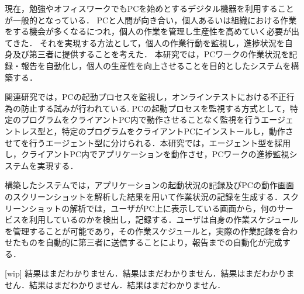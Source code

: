 現在，勉強やオフィスワークでもPCを始めとするデジタル機器を利用することが一般的となっている．
PCと人間が向き合い，個人あるいは組織における作業をする機会が多くなるにつれ，個人の作業を管理し生産性を高めていく必要が出てきた．
それを実現する方法として，個人の作業行動を監視し，進捗状況を自身及び第三者に提供することを考えた．
本研究では，PCワークの作業状況を記録・報告を自動化し，個人の生産性を向上させることを目的としたシステムを構築する．

関連研究では，PCの起動プロセスを監視し，オンラインテストにおける不正行為の防止する試みが行われている.
PCの起動プロセスを監視する方式として，特定のプログラムをクライアントPC内で動作させることなく監視を行うエージェントレス型と，特定のプログラムをクライアントPCにインストールし，動作させてを行うエージェント型に分けられる．本研究では，エージェント型を採用し，クライアントPC内でアプリケーションを動作させ，PCワークの進捗監視システムを実現する．

構築したシステムでは，アプリケーションの起動状況の記録及びPCの動作画面のスクリーンショットを解析した結果を用いて作業状況の記録を生成する．スクリーンショットの解析では，ユーザがPC上に表示している画面から，何のサービスを利用しているのかを検出し，記録する．ユーザは自身の作業スケジュールを管理することが可能であり，その作業スケジュールと，実際の作業記録を合わせたものを自動的に第三者に送信することにより，報告までの自動化が完成する．

[wip] 結果はまだわかりません．結果はまだわかりません．結果はまだわかりません．結果はまだわかりません．結果はまだわかりません．
